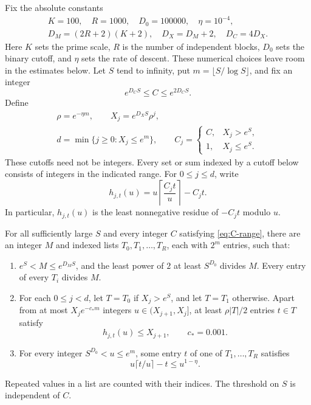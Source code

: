 Fix the absolute constants
\begin{equation}\label{eq:residue-constants}
 \begin{gathered}
 K=100,\quad R=1000,\quad D_0=100000,\quad \eta=10^{-4},\\
 D_M=(2R+2)(K+2),\quad D_X=D_M+2,\quad D_C=4D_X.
 \end{gathered}
\end{equation}
Here \(K\) sets the prime scale, \(R\) is the number of independent
blocks, \(D_0\) sets the binary cutoff, and \(\eta\) sets the rate of
descent. These numerical choices leave room in the estimates below.
Let \(S\) tend to infinity, put \(m=\lfloor S/\log S\rfloor\), and fix
an integer
\begin{equation}\label{eq:C-range}
 e^{D_CS}\le C\le e^{2D_CS}.
\end{equation}
Define
\begin{equation}\label{eq:levels}
 \begin{gathered}
 \rho=e^{-\eta m},\qquad X_j=e^{D_XS}\rho^j,\\
 d=\min\{j\ge0:X_j\le e^m\},\qquad
 C_j=
 \begin{cases}
 C,&X_j>e^S,\\
 1,&X_j\le e^S.
 \end{cases}
 \end{gathered}
\end{equation}
These cutoffs need not be integers.  Every set or sum indexed by a
cutoff below consists of integers in the indicated range.
For \(0\le j\le d\), write
\begin{equation}\label{eq:least-residue}
 h_{j,t}(u)=u\left\lceil\frac{C_jt}{u}\right\rceil-C_jt.
\end{equation}
In particular, \(h_{j,t}(u)\) is the least nonnegative residue of
\(-C_jt\) modulo \(u\).

\begin{lemma}\label{lem:residues}
For all sufficiently large \(S\) and every integer \(C\) satisfying
\eqref{eq:C-range}, there are an integer \(M\) and indexed lists
\(T_0,T_1,\ldots,T_R\), each with \(2^m\) entries, such that:
\begin{enumerate}
\item
\(e^S<M\le e^{D_MS}\), and the least power of \(2\) at least
\(S^{D_0}\) divides \(M\).  Every entry of every \(T_i\) divides \(M\).
\item
For each \(0\le j<d\), let \(T=T_0\) if \(X_j>e^S\), and let
\(T=T_1\) otherwise.  Apart from at most
\(X_j e^{-c_*m}\) integers \(u\in(X_{j+1},X_j]\), at least
\(\rho |T|/2\) entries \(t\in T\) satisfy
\[
 h_{j,t}(u)\le X_{j+1},
 \qquad c_*=0.001.
\]
\item
For every integer \(S^{D_0}<u\le e^m\), some entry \(t\) of one of
\(T_1,\ldots,T_R\) satisfies
\[
 u\lceil t/u\rceil-t\le u^{1-\eta}.
\]
\end{enumerate}
Repeated values in a list are counted with their indices.
The threshold on \(S\) is independent of \(C\).
\end{lemma}

